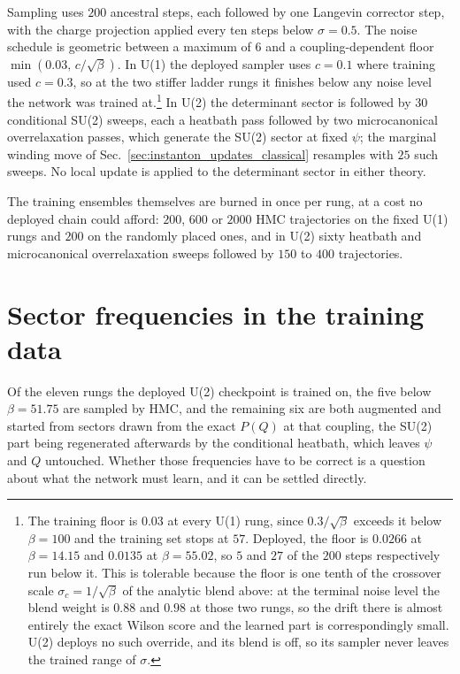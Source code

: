\documentclass[prd, twocolumn, superscriptaddress, nofootinbib,floatfix]{revtex4-2}
\DeclareRobustCommand{\sect}[1]{Sec.~\ref{sec:#1}}
\begin{document}
Sampling uses $200$ ancestral steps, each followed by one
Langevin corrector step, with the charge projection applied every ten steps
below $\sigma=0.5$. The noise schedule is geometric between a maximum of $6$ and
a coupling-dependent floor $\min(0.03,\,c/\sqrt{\beta})$. In U(1) the deployed
sampler uses $c=0.1$ where training used $c=0.3$, so at the two stiffer ladder
rungs it finishes below any noise level the network was trained
at.\footnote{The training floor is $0.03$ at every U(1) rung, since
$0.3/\sqrt{\beta}$ exceeds it below $\beta=100$ and the training set stops at
$57$. Deployed, the floor is $0.0266$ at $\beta=14.15$ and $0.0135$ at
$\beta=55.02$, so $5$ and $27$ of the $200$ steps respectively run below it.
This is tolerable because the floor is one tenth of the crossover scale
$\sigma_c=1/\sqrt{\beta}$ of the analytic blend above: at the terminal noise
level the blend weight is $0.88$ and $0.98$ at those two rungs, so the drift
there is almost entirely the exact Wilson score and the learned part is
correspondingly small. U(2) deploys no such override, and its blend is off, so
its sampler never leaves the trained range of $\sigma$.} In U(2) the determinant sector is followed by $30$
conditional SU(2) sweeps, each a heatbath pass followed by two microcanonical
overrelaxation passes, which generate the SU(2) sector at fixed $\psi$; the
marginal winding move of \sect{instanton_updates_classical} resamples with $25$
such sweeps. No local update is applied to the determinant sector in either
theory.

The training ensembles themselves are burned in once per rung, at a cost no
deployed chain could afford: $200$, $600$ or $2000$ HMC trajectories on the
fixed U(1) rungs and $200$ on the randomly placed ones, and in U(2) sixty
heatbath and microcanonical
overrelaxation \cite{creutz1987} sweeps followed by $150$ to $400$
trajectories.

\section{Sector frequencies in the training data}
\label{app:sectors}

Of the eleven rungs the deployed U(2) checkpoint is trained on, the five below
$\beta=51.75$ are sampled by HMC, and the remaining six are both augmented and
started from sectors drawn from the exact $P(Q)$ at that coupling, the SU(2)
part being regenerated afterwards by the conditional heatbath, which leaves
$\psi$ and $Q$ untouched. Whether those frequencies have to be correct is a
question about what the network must learn, and it can be settled directly.
\end{document}
